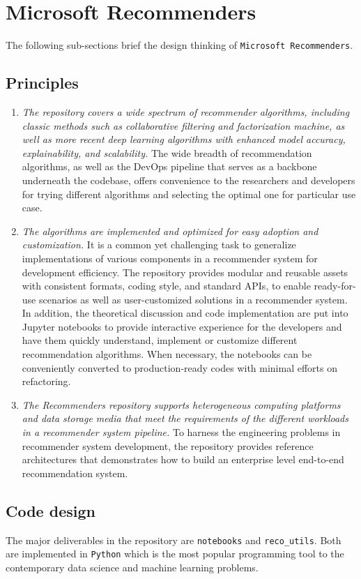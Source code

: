 \documentclass[twoside,11pt]{article}
\begin{document}
\section{Microsoft Recommenders}
The following sub-sections brief the design thinking of \verb|Microsoft Recommenders|.

\subsection{Principles}
\begin{enumerate}
\item \emph{The repository covers a wide spectrum of recommender algorithms, including classic methods such as collaborative filtering and factorization machine, as well as more recent deep learning algorithms with enhanced model accuracy, explainability, and scalability.} The wide breadth of recommendation algorithms, as well as the DevOps pipeline that serves as a backbone underneath the codebase, offers convenience to the researchers and developers for trying different algorithms and selecting the optimal one for particular use case. 
\item \emph{The algorithms are implemented and optimized for easy adoption and customization.} It is a common yet challenging task to generalize implementations of various components in a recommender system for development efficiency. The repository provides modular and reusable assets with consistent formats, coding style, and standard APIs, to enable ready-for-use scenarios as well as user-customized solutions in a recommender system. In addition, the theoretical discussion and code implementation are put into Jupyter notebooks to provide interactive experience for the developers and have them quickly understand, implement or customize different recommendation algorithms. When necessary, the notebooks can be conveniently converted to production-ready codes with minimal efforts on refactoring. 
\item \emph{The Recommenders repository supports heterogeneous computing platforms and data storage media that meet the requirements of the different workloads in a recommender system pipeline.} To harness the engineering problems in recommender system development, the repository provides reference architectures that demonstrates how to build an enterprise level end-to-end recommendation system.  
\end{enumerate}

\subsection{Code design}
The major deliverables in the repository are \verb|notebooks| and \verb|reco_utils|. Both are implemented in \verb|Python| which is the most popular programming tool to the contemporary data science and machine learning problems.
\end{document}
